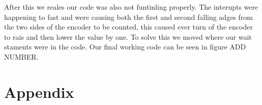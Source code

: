 \documentclass[prl,12pt,notitlepage,aps,onecolumn,superscriptaddress]{revtex4-1}
\begin{document}
After this we reales our code was also not funtinling properly. The interupts were happening to fast and were causing both the first and second falling adges from the two sides of the encoder to be counted, this caused ever turn of the encoder to rais and then lower the value by one. To solve this we moved where our wait staments were in the code. Our final working code can be seen in figure ADD NUMBER.

\section{Appendix}
\end{document}
